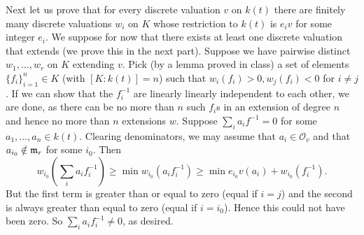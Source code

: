 \documentclass{../../mathnotes}
\begin{document}
Next let us prove that for every discrete valuation $v$ on $k(t)$ there are finitely many discrete valuations $w_i$ on $K$ whose
restriction to $k(t)$ is $e_iv$ for some integer $e_i$. We suppose for now that there exists at least one discrete valuation that extends
(we prove this in the next part). Suppose we have pairwise distinct $w_1,\ldots,w_r$ on $K$ extending $v$. Pick (by a lemma
proved in class) a set of elements $\{f_i\}_{i=1}^n\in K$ (with $[K:k(t)]=n$) such that $w_i(f_i)>0,w_j(f_i)<0$ for $i\neq j$. If we can show that 
the $f_i^{-1}$ are linearly linearly independent to each other, we are done, as there can be no more than $n$ such $f_i$s in an extension of degree $n$
and hence no more than $n$ extensions $w$. Suppose $\sum_ia_if^{-1}=0$ for some $a_1,\ldots, a_n\in k(t)$.
Clearing denominators, we may assume that $a_i\in\mathcal{O}_v$ and that $a_{i_0}\notin\mathfrak m_r$ for some $i_0$. Then
\[w_{i_0}\left(\sum_i a_if^{-1}_i\right)\geq\min w_{i_0}(a_if^{-1}_i)\geq\min e_{i_0}v(a_i)+w_{i_0}(f_i^{-1}).\]
But the first term is greater than or equal to zero (equal if $i=j$) and the second is always greater than equal to zero (equal if $i=i_0$).
Hence this could not have been zero. So $\sum_i a_if_i^{-1}\neq 0$, as desired.
\end{document}
